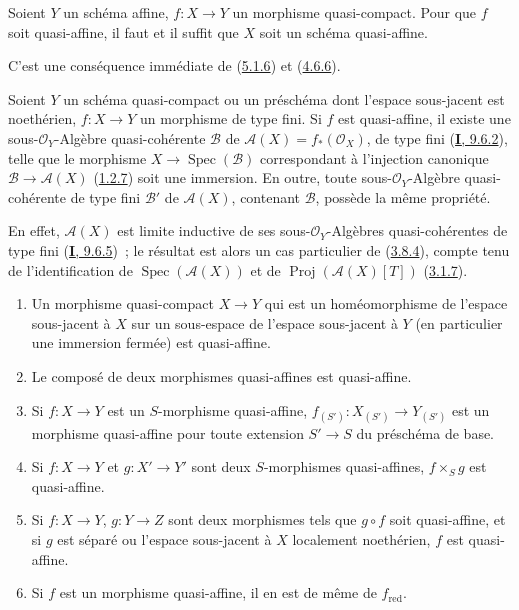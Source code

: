\begin{corollary}[5.1.8]
\label{II.5.1.8-fr}
Soient $Y$ un schéma affine, $f:X\to Y$ un morphisme quasi-compact. Pour que
$f$ soit quasi-affine, il faut et il suffit que $X$ soit un schéma
quasi-affine.
\end{corollary}

C'est une conséquence immédiate de (\hyperref[II.5.1.6-fr]{5.1.6}) et
(\hyperref[II.4.6.6-fr]{4.6.6}).

\begin{corollary}[5.1.9]
\label{II.5.1.9-fr}
Soient $Y$ un schéma quasi-compact ou un préschéma dont l'espace sous-jacent
est noethérien, $f:X\to Y$ un morphisme \textup{de type fini}. Si $f$ est
quasi-affine, il existe une sous-$\mathcal{O}_Y$-Algèbre quasi-cohérente
$\mathcal{B}$ de $\mathcal{A}(X)=f_*(\mathcal{O}_X)$, \textup{de type fini
(\hyperref[I.9.6.2-fr]{\textbf{I}, 9.6.2})}, telle que le morphisme
$X\to\operatorname{Spec}(\mathcal{B})$ correspondant à l'injection canonique
$\mathcal{B}\to\mathcal{A}(X)$ \textup{(\hyperref[II.1.2.7-fr]{1.2.7})} soit une
immersion. En outre, toute sous-$\mathcal{O}_Y$-Algèbre quasi-cohérente de
type fini $\mathcal{B}'$ de $\mathcal{A}(X)$, contenant $\mathcal{B}$,
possède la même propriété.
\end{corollary}

En effet, $\mathcal{A}(X)$ est limite inductive de ses
sous-$\mathcal{O}_Y$-Algèbres quasi-cohérentes de type fini
(\hyperref[I.9.6.5-fr]{\textbf{I}, 9.6.5})~; le résultat est alors un cas particulier
de (\hyperref[II.3.8.4-fr]{3.8.4}), compte tenu de l'identification de
$\operatorname{Spec}(\mathcal{A}(X))$ et de
$\operatorname{Proj}(\mathcal{A}(X)[T])$
(\hyperref[II.3.1.7-fr]{3.1.7}).

\begin{proposition}[5.1.10]
\label{II.5.1.10-fr}
\begin{enumerate}
  \item[\rm{(i)}] Un morphisme quasi-compact $X\to Y$ qui est un
  homéomorphisme de l'espace sous-jacent à $X$ sur un sous-espace de
  l'espace sous-jacent à $Y$ (en particulier une immersion fermée) est
  quasi-affine.
  \item[\rm{(ii)}] Le composé de deux morphismes quasi-affines est
  quasi-affine.
  \item[\rm{(iii)}] Si $f:X\to Y$ est un $S$-morphisme quasi-affine,
  $f_{(S')}:X_{(S')}\to Y_{(S')}$ est un morphisme quasi-affine pour toute
  extension $S'\to S$ du préschéma de base.
  \item[\rm{(iv)}] Si $f:X\to Y$ et $g:X'\to Y'$ sont deux $S$-morphismes
  quasi-affines, $f\times_S g$ est quasi-affine.
  \item[\rm{(v)}] Si $f:X\to Y$, $g:Y\to Z$ sont deux morphismes tels que
  $g\circ f$ soit quasi-affine, et si $g$ est séparé ou l'espace sous-jacent
  à $X$ localement noethérien, $f$ est quasi-affine.
  \item[\rm{(vi)}] Si $f$ est un morphisme quasi-affine, il en est de même
  de $f_{\mathrm{red}}$.
\end{enumerate}
\end{proposition}

